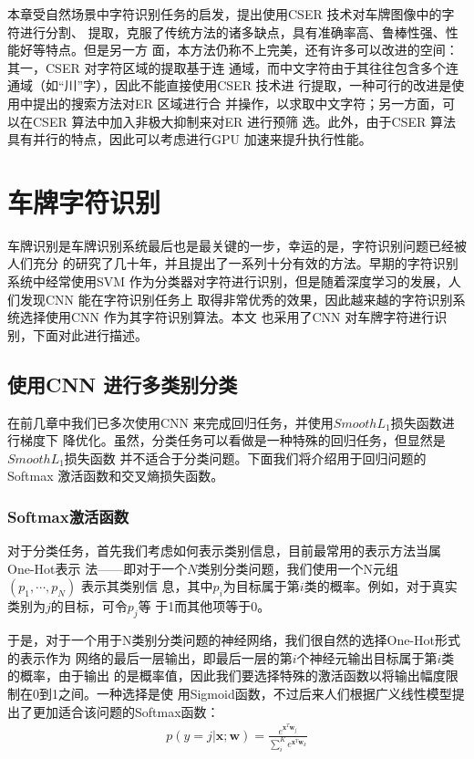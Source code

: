 本章受自然场景中字符识别任务的启发，提出使用CSER 技术对车牌图像中的字符进行分割、
提取，克服了传统方法的诸多缺点，具有准确率高、鲁棒性强、性能好等特点。但是另一方
面，本方法仍称不上完美，还有许多可以改进的空间：其一，CSER 对字符区域的提取基于连
通域，而中文字符由于其往往包含多个连通域（如“川”字），因此不能直接使用CSER 技术进
行提取，一种可行的改进是使用\cite{Neumann:2011dy}中提出的搜索方法对ER 区域进行合
并操作，以求取中文字符；另一方面，可以在CSER 算法中加入非极大抑制来对ER 进行预筛
选。此外，由于CSER 算法具有并行的特点，因此可以考虑进行GPU 加速来提升执行性能。

\chapter{车牌字符识别}

车牌识别是车牌识别系统最后也是最关键的一步，幸运的是，字符识别问题已经被人们充分
的研究了几十年，并且提出了一系列十分有效的方法。早期的字符识别系统中经常使用SVM 
作为分类器对字符进行识别，但是随着深度学习的发展，人们发现CNN 能在字符识别任务上
取得非常优秀的效果，因此越来越的字符识别系统选择使用CNN 作为其字符识别算法。本文
也采用了CNN 对车牌字符进行识别，下面对此进行描述。

\section{使用CNN 进行多类别分类}

在前几章中我们已多次使用CNN 来完成回归任务，并使用$Smooth L_1$损失函数进行梯度下
降优化。虽然，分类任务可以看做是一种特殊的回归任务，但显然是$Smooth L_1$损失函数
并不适合于分类问题。下面我们将介绍用于回归问题的Softmax 激活函数和交叉熵损失函数。

\subsection{Softmax激活函数}

对于分类任务，首先我们考虑如何表示类别信息，目前最常用的表示方法当属One-Hot表示
法——即对于一个$N$类别分类问题，我们使用一个N元组 $(p_1, \cdots, p_N)$ 表示其类别信
息，其中$p_i$为目标属于第$i$类的概率。例如，对于真实类别为$j$的目标，可令$p_j$等
于1而其他项等于0。

于是，对于一个用于N类别分类问题的神经网络，我们很自然的选择One-Hot形式的表示作为
网络的最后一层输出，即最后一层的第$i$个神经元输出目标属于第$i$类的概率，由于输出
的是概率值，因此我们要选择特殊的激活函数以将输出幅度限制在0到1之间。一种选择是使
用Sigmoid函数，不过后来人们根据广义线性模型提出了更加适合该问题的Softmax函数：
\begin{equation}
\begin{aligned}
p(y=j|\mathbf{x};\mathbf{w}) = \frac{e^{\mathbf{x}^T\mathbf{w}_j}}{\sum_{i}^{K}{e^{\mathbf{x}^T\mathbf{w}_k}}}
\end{aligned}
\end{equation}

